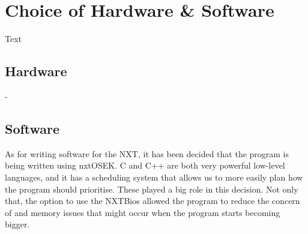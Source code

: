 \section{Choice of Hardware \& Software}
Text

\subsection*{Hardware}
-


\subsection*{Software}
As for writing software for the NXT, it has been decided that the program is being written using nxtOSEK. C and C++ are both very powerful low-level languages, and it has a scheduling system that allows us to more easily plan how the program should prioritise. These played a big role in this decision. Not only that, the option to use the NXTBios allowed the program to reduce the concern of and memory issues that might occur when the program starts becoming bigger.
